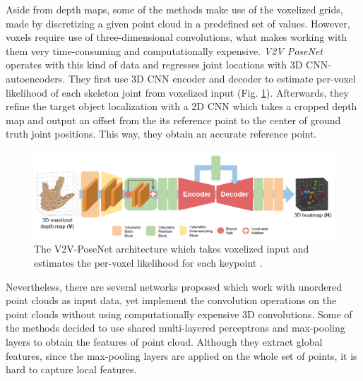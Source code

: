 \vspace{5mm}
\noindent Aside from depth maps, some of the methods make use of the voxelized grids, made by discretizing a given point cloud in a predefined set of values. However, voxels require use of three-dimensional convolutions, what makes working with them very time-consuming and computationally expensive. \textit{V2V PoseNet} \cite{DBLP:journals/corr/abs-1711-07399} operates with this kind of data and regresses joint locations with 3D CNN-autoencoders. They first use 3D CNN encoder and decoder to estimate per-voxel likelihood of each skeleton joint from voxelized input (Fig. \ref{fig:v2vposenet}). Afterwards, they refine the target object localization with a 2D CNN which takes a cropped depth map and output an offset from the its reference point to the center of ground truth joint positions. This way, they obtain an accurate reference point.\par

\vspace{5mm}
\begin{figure}[H]
\begin{center}
  \includegraphics[width=\textwidth]{images/related_work/v2vposenet.PNG}
  \caption[The V2V-PoseNet architecture \cite{DBLP:journals/corr/abs-1711-07399}.]{The V2V-PoseNet architecture which takes voxelized input and estimates the per-voxel likelihood for each keypoint \cite{DBLP:journals/corr/abs-1711-07399}.}
  \label{fig:v2vposenet}
\end{center}
\end{figure}



\noindent Nevertheless, there are several networks proposed which work with unordered point clouds as input data, yet implement the convolution operations on the point clouds without using computationally expensive 3D convolutions. Some of the methods decided to use shared multi-layered perceptrons and max-pooling layers to obtain the features of point cloud. Although they extract global features, since the max-pooling layers are applied on the whole set of points, it is hard to capture local features.\par
\vspace{5mm}


